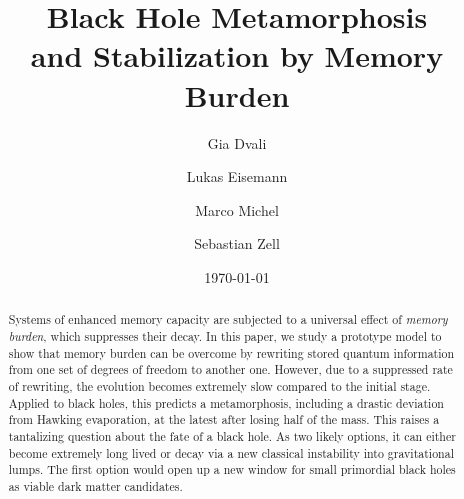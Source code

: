 \documentclass[aps,prd,reprint,superscriptaddress,nofootinbib]{revtex4-2}
\begin{document}
\title{Black Hole Metamorphosis   
\\ 
and Stabilization by Memory Burden}

\author{Gia Dvali}


\author{Lukas Eisemann}


\author{Marco Michel}

\author{Sebastian Zell}








\date{\today}

\begin{abstract}
	Systems of enhanced memory capacity are subjected to a universal effect of {\it memory burden}, which suppresses their decay. In this paper, we study a prototype model to show that memory burden can be overcome by rewriting stored quantum information from one set of degrees of freedom to another one. However, due to a suppressed rate of rewriting, the evolution becomes extremely slow compared to the initial stage.
	Applied to black holes, this predicts a metamorphosis, including a drastic deviation from Hawking evaporation, at the latest after losing half of 
the mass. This raises a 
		tantalizing question about the fate of a black hole.
		As two likely options, it can  either become extremely long lived 
	or decay via a new classical instability into gravitational lumps. 
	The first option would
	open up a new window for small primordial black holes as viable dark matter candidates.
\end{abstract}
\end{document}
